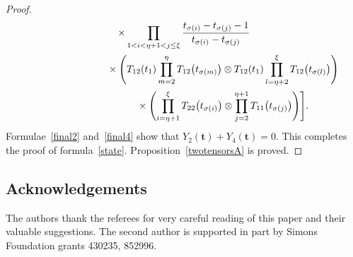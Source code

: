 \documentclass[10pt,a4paper]{amsart}
\numberwithin{equation}{section}
\begin{document}
\begin{proof}
\begin{gather}
 \times\prod_{1< i<\eta+1<j \leq \xi} \frac{t_{\sigma(i)}-t_{\sigma(j)}-1}{t_{\sigma(i)}-t_{\sigma(j)}} \nonumber\\
 \hphantom{Y_4(\boldsymbol{t})=\times\sum_{\sigma\in S_{\xi-1}'} \Biggl[}{}
\times\Biggl(T_{12}(t_1) \prod_{m=2}^{\eta} T_{12} \bigl(t_{\sigma(m)}\bigr) \otimes T_{12}(t_1) \prod_{l=\eta+2}^{\xi } T_{12} \bigl(t_{\sigma(l)}\bigr) \Biggr)\nonumber \\
 \hphantom{Y_4(\boldsymbol{t})=\times\sum_{\sigma\in S_{\xi-1}'} \Biggl[}{}
\times\Biggl( \prod_{i=\eta+1}^{\xi } T _{22}\bigl(t_{\sigma(i)}\bigr)\otimes \prod_{j=2}^{\eta+1} T _{11}\bigl(t_{\sigma(j)}\bigr)\Biggr) \Biggr].\label{final4}
\end{gather}
Formulae~\eqref{final2} and~\eqref{final4} show that $Y_2(\boldsymbol{t})+Y_4(\boldsymbol{t})=0$. This completes the proof of formula~\eqref{state}. Proposition~\ref{twotensorsA} is proved.
\end{proof}


\subsection*{Acknowledgements}
The authors thank the referees for very careful reading of this paper and their valuable
suggestions. The second author is supported in part by Simons Foundation grants 430235, 852996.

\end{document}
